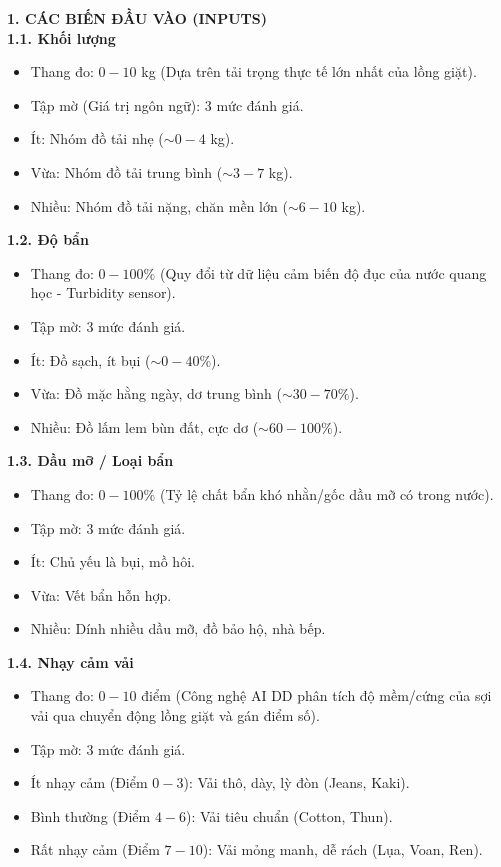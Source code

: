 \documentclass[12pt, a4paper]{article}
\begin{document}
\textbf{1. CÁC BIẾN ĐẦU VÀO (INPUTS)}\\
\textbf{1.1. Khối lượng}
\begin{itemize}
    \item Thang đo: $0 - 10$ kg (Dựa trên tải trọng thực tế lớn nhất của lồng giặt).
    \item Tập mờ (Giá trị ngôn ngữ): 3 mức đánh giá.
    \item Ít: Nhóm đồ tải nhẹ ($\sim 0 - 4$ kg).
    \item Vừa: Nhóm đồ tải trung bình ($\sim 3 - 7$ kg).
    \item Nhiều: Nhóm đồ tải nặng, chăn mền lớn ($\sim 6 - 10$ kg).
\end{itemize}
\textbf{1.2. Độ bẩn}
\begin{itemize}
    \item Thang đo: $0 - 100\%$ (Quy đổi từ dữ liệu cảm biến độ đục của nước quang học - Turbidity sensor).
    \item Tập mờ: 3 mức đánh giá.
    \item Ít: Đồ sạch, ít bụi ($\sim 0 - 40\%$).
    \item Vừa: Đồ mặc hằng ngày, dơ trung bình ($\sim 30 - 70\%$).
    \item Nhiều: Đồ lấm lem bùn đất, cực dơ ($\sim 60 - 100\%$).
\end{itemize}
\textbf{1.3. Dầu mỡ / Loại bẩn}
\begin{itemize}
    \item Thang đo: $0 - 100\%$ (Tỷ lệ chất bẩn khó nhằn/gốc dầu mỡ có trong nước).
    \item Tập mờ: 3 mức đánh giá.
    \item Ít: Chủ yếu là bụi, mồ hôi.
    \item Vừa: Vết bẩn hỗn hợp.
    \item Nhiều: Dính nhiều dầu mỡ, đồ bảo hộ, nhà bếp.
\end{itemize}
\textbf{1.4. Nhạy cảm vải}
\begin{itemize}
    \item Thang đo: $0 - 10$ điểm (Công nghệ AI DD phân tích độ mềm/cứng của sợi vải qua chuyển động lồng giặt và gán điểm số).
    \item Tập mờ: 3 mức đánh giá.
    \item Ít nhạy cảm (Điểm $0 - 3$): Vải thô, dày, lỳ đòn (Jeans, Kaki).
    \item Bình thường (Điểm $4 - 6$): Vải tiêu chuẩn (Cotton, Thun).
    \item Rất nhạy cảm (Điểm $7 - 10$): Vải mỏng manh, dễ rách (Lụa, Voan, Ren).
\end{itemize}
\end{document}
